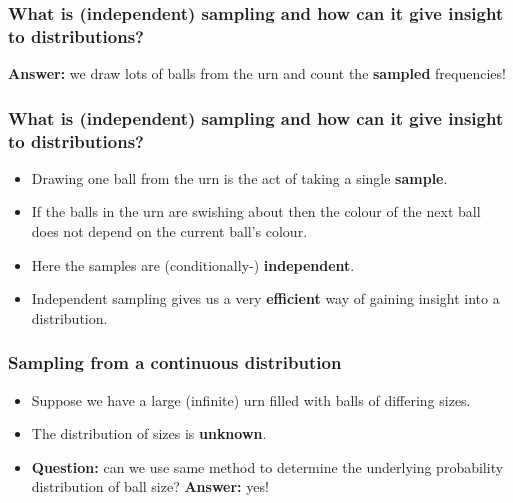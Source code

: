 \documentclass[handout]{beamer}
\begin{document}
\begin{frame}
\frametitle{What is (independent) sampling and how can it give insight to distributions?}
 \textbf{Answer:} we draw lots of balls from the urn and count the \textbf{sampled} frequencies!


\begin{figure}[t]
\centerline{}
\end{figure}

\end{frame}

\begin{frame}
\frametitle{What is (independent) sampling and how can it give insight to distributions?}

\begin{itemize}
\item<2-> Drawing one ball from the urn is the act of taking a single \textbf{sample}.
\item<3-> If the balls in the urn are swishing about then the colour of the next ball does not depend on the current ball's colour.
\item<4-> Here the samples are (conditionally-) \textbf{independent}.
\item<5-> Independent sampling gives us a very \textbf{efficient} way of gaining insight into a distribution.
\end{itemize}

\begin{figure}[t]
\centerline{}
\end{figure}

\end{frame}

\begin{frame}
\frametitle{Sampling from a continuous distribution}
\begin{itemize}
\item<2-> Suppose we have a large (infinite) urn filled with balls of differing sizes.
\item<3-> The distribution of sizes is \textbf{unknown}.
\item<4-> \textbf{Question:} can we use same method to determine the underlying probability distribution of ball size?  \textbf{Answer:} yes!
\end{itemize}

\begin{figure}[t]
\centerline{}
\end{figure}

\end{frame}
\end{document}
